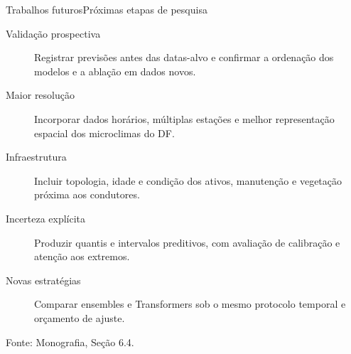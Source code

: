 \documentclass[10pt]{beamer}
\newcommand{\source}[1]{%
  \par\vfill{\raggedleft\tiny\color{gray}Fonte: #1\par}%
}
\begin{document}
\begin{frame}{Trabalhos futuros}{Próximas etapas de pesquisa}
  \small
  \begin{description}
    \item[Validação prospectiva] Registrar previsões antes das datas-alvo e confirmar a ordenação dos modelos e a ablação em dados novos.
    \item[Maior resolução] Incorporar dados horários, múltiplas estações e melhor representação espacial dos microclimas do DF.
    \item[Infraestrutura] Incluir topologia, idade e condição dos ativos, manutenção e vegetação próxima aos condutores.
    \item[Incerteza explícita] Produzir quantis e intervalos preditivos, com avaliação de calibração e atenção aos extremos.
    \item[Novas estratégias] Comparar ensembles e Transformers sob o mesmo protocolo temporal e orçamento de ajuste.
  \end{description}

  \source{Monografia, Seção 6.4.}
\end{frame}


{\1
\begin{frame}
\end{frame}}


\appendix
\end{document}
